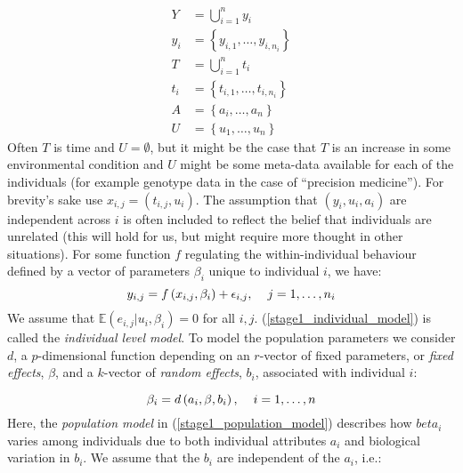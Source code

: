\documentclass[11pt]{article} %
\begin{document}
\begin{equation}
\begin{array}{ll}
Y &= \bigcup\limits_{i=1}^n y_i\\
y_i &= \left\{y_{i,1},\ldots,y_{i,n_i}\right\} \\
T &= \bigcup\limits_{i=1}^n t_i \\
t_i &= \left\{t_{i,1},\ldots,t_{i,n_i}\right\} \\
A &= \left\{a_i,\ldots,a_n\right\} \\
U &= \left\{u_1,\ldots,u_n\right\}
\end{array}
\end{equation}
Often $T$ is time and $U=\emptyset$, but it might be the case that $T$ is an increase in some environmental condition and $U$ might be some meta-data available for each of the individuals (for example genotype data in the case of ``precision medicine''). For brevity's sake use $x_{i,j} = \left(t_{i,j}, u_i\right)$. The assumption that $(y_i,u_i,a_i)$ are independent across $i$ is often included to reflect the belief that individuals are unrelated (this will hold for us, but might require more thought in other situations). For some function $f$ regulating the within-individual behaviour defined by a vector of parameters $\beta_i$ unique to individual $i$, we have:
\begin{equation} \label{stage1_individual_model}
y_{i,j} = f\left(x_{i,j}, \beta_i\right) + \epsilon_{i,j}, \hspace{4mm} j = 1,\ldots,n_i
\end{equation}
We assume that $\mathbb{E}\left(e_{i,j}|u_i,\beta_i\right)=0$ for all $i, j$. (\ref{stage1_individual_model}) is called the \emph{individual level model}. To model the population parameters we consider $d$, a $p$-dimensional function depending on an $r$-vector of fixed parameters, or \emph{fixed effects}, $\beta$, and a $k$-vector of \emph{random effects}, $b_i$, associated with individual $i$:

\begin{equation} \label{stage1_population_model}
\beta_i = d\left(a_i,\beta,b_i\right), \hspace{4mm} i = 1,\ldots,n
\end{equation}
Here, the \emph{population model} in (\ref{stage1_population_model}) describes how $beta_i$ varies among individuals due to both individual attributes $a_i$ and biological variation in $b_i$. We assume that the $b_i$ are independent of the $a_i$, i.e.:
\end{document}
